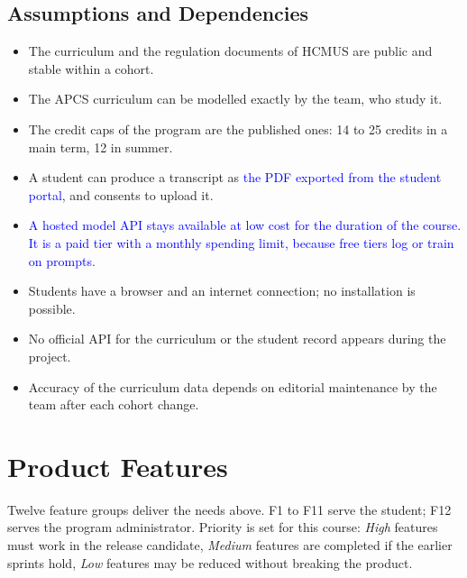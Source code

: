 \documentclass{article}
\begin{document}
\subsection{Assumptions and Dependencies}
\begin{itemize}
  \item The curriculum and the regulation documents of HCMUS are public and stable within a cohort.
  \item The APCS curriculum can be modelled exactly by the team, who study it.
  \item The credit caps of the program are the published ones: 14 to 25 credits in a main term, 12 in summer.
  \item A student can produce a transcript as \textcolor{blue}{the PDF exported from the student portal}, and consents to upload it.
  \item \textcolor{blue}{A hosted model API stays available at low cost for the duration of the course. It is a paid tier
        with a monthly spending limit, because free tiers log or train on prompts.}
  \item Students have a browser and an internet connection; no installation is possible.
  \item No official API for the curriculum or the student record appears during the project.
  \item Accuracy of the curriculum data depends on editorial maintenance by the team after each cohort change.
\end{itemize}

\section{Product Features}
Twelve feature groups deliver the needs above. F1 to F11 serve the student; F12 serves the program administrator. Priority
is set for this course: \emph{High} features must work in the release candidate, \emph{Medium} features are completed if the
earlier sprints hold, \emph{Low} features may be reduced without breaking the product.
\end{document}
